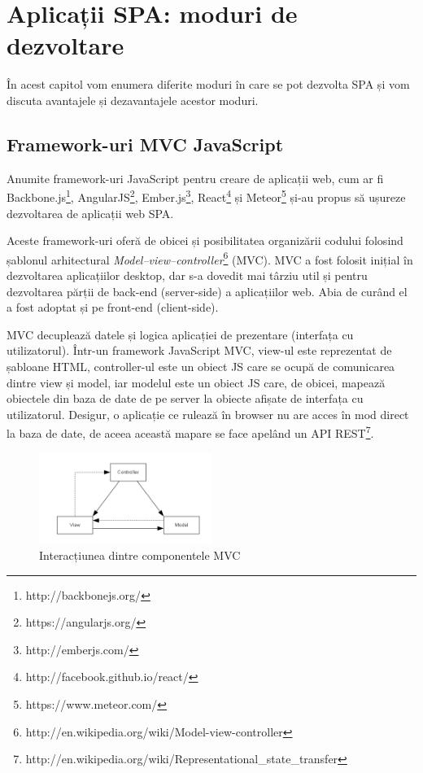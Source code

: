 \chapter{Aplicații SPA: moduri de dezvoltare}
În acest capitol vom enumera diferite moduri în care se pot dezvolta SPA și
vom discuta avantajele și dezavantajele acestor moduri.

\section{Framework-uri MVC JavaScript}
Anumite framework-uri JavaScript pentru creare de aplicații web, cum ar fi
Backbone.js\footnote{http://backbonejs.org/},
AngularJS\footnote{https://angularjs.org/},
Ember.js\footnote{http://emberjs.com/},
React\footnote{http://facebook.github.io/react/} și
Meteor\footnote{https://www.meteor.com/}
și-au propus să ușureze dezvoltarea de aplicații web SPA.

Aceste framework-uri oferă de obicei și posibilitatea organizării codului
folosind șablonul arhitectural 
\emph{Model–view–controller}\footnote{http://en.wikipedia.org/wiki/Model-view-controller}
(MVC). MVC a fost
folosit inițial în dezvoltarea aplicațiilor desktop, dar s-a dovedit mai târziu
util și pentru dezvoltarea părții de back-end (server-side) a aplicațiilor web.
Abia de curând el a fost adoptat și pe front-end (client-side).

MVC decuplează datele și logica aplicației de prezentare (interfața cu utilizatorul). Într-un framework JavaScript MVC,
view-ul este reprezentat de șabloane HTML, controller-ul este un obiect JS
care se ocupă de comunicarea dintre view și model, iar modelul este un obiect JS
care, de obicei, mapează obiectele din baza de date de pe server la obiecte
afișate de interfața cu utilizatorul. Desigur, o aplicație ce rulează în browser
nu are acces în mod direct la baza de date, de aceea această mapare se face apelând un
API REST\footnote{http://en.wikipedia.org/wiki/Representational\_state\_transfer}.

\begin{figure}[t]
  \centering
    \includegraphics[width=0.5\textwidth]{./MVC}
  \caption{Interacțiunea dintre componentele MVC}
\end{figure}

